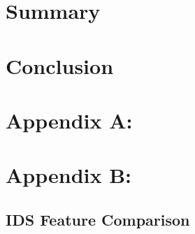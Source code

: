 \documentclass[conference]{IEEEtran}
\begin{document}
\newpage

\section{Summary}


\section{Conclusion}


\newpage

\section*{Appendix A:}





\newpage

\section*{Appendix B:}

\subsection{IDS Feature Comparison}
\end{document}
